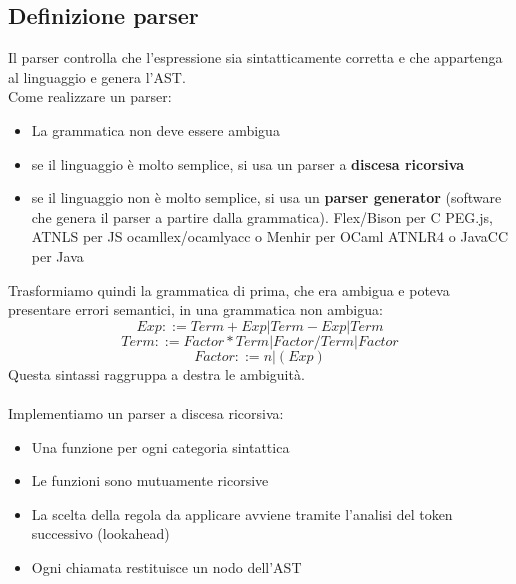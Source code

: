 \documentclass[12pt,a4paper]{article}
\begin{document}
\subsection{Definizione parser}
Il parser controlla che l'espressione sia sintatticamente corretta e che appartenga al linguaggio e genera l'AST.\\
Come realizzare un parser:
\begin{itemize}
  \item La grammatica non deve essere ambigua
  \item se il linguaggio è molto semplice, si usa un parser a \textbf{discesa ricorsiva}
  \item se il linguaggio non è molto semplice, si usa un \textbf{parser generator} (software che genera il parser a partire dalla grammatica).
  \subitem Flex/Bison per C
  \subitem PEG.js, ATNLS per JS
  \subitem ocamllex/ocamlyacc o Menhir per OCaml
  \subitem ATNLR4 o JavaCC per Java
\end{itemize}
Trasformiamo quindi la grammatica di prima, che era ambigua e poteva presentare errori semantici, in una grammatica non ambigua:
\[
Exp ::= Term + Exp | Term - Exp | Term
\]
\[
Term ::= Factor * Term | Factor / Term | Factor
\]
\[
Factor ::= n | (Exp)
\]
Questa sintassi raggruppa a destra le ambiguità.\\\\
Implementiamo un parser a discesa ricorsiva:
\begin{itemize}
  \item Una funzione per ogni categoria sintattica
  \item Le funzioni sono mutuamente ricorsive
  \item La scelta della regola da applicare avviene tramite l'analisi del token successivo (lookahead)
  \item Ogni chiamata restituisce un nodo dell'AST
\end{itemize}
\end{document}
